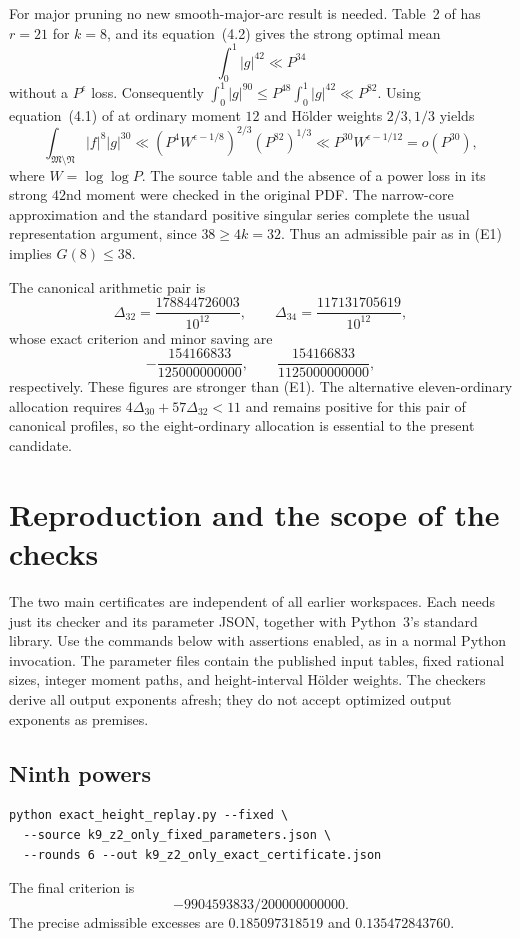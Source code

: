 \documentclass[11pt,letterpaper]{article}
\numberwithin{equation}{section}
\begin{document}
For major pruning no new smooth-major-arc result is needed. Table~2 of
\cite{W16} has $r=21$ for $k=8$, and its equation~(4.2) gives the strong
optimal mean
\[
 \int_0^1|g|^{42}\ll P^{34}
\]
without a $P^\epsilon$ loss. Consequently
$\int_0^1|g|^{90}\le P^{48}\int_0^1|g|^{42}\ll P^{82}$.
Using equation~(4.1) of \cite{W16} at ordinary moment $12$ and H\"older
weights $2/3,1/3$ yields
\[
 \int_{\mathfrak M\setminus\mathfrak N}|f|^8|g|^{30}
 \ll (P^4W^{\epsilon-1/8})^{2/3}(P^{82})^{1/3}
 \ll P^{30}W^{\epsilon-1/12}=o(P^{30}),
\]
where $W=\log\log P$. The source table and the absence of a power loss
in its strong $42$nd moment were checked in the original PDF.
The narrow-core approximation and the standard positive singular series
complete the usual representation argument, since $38\ge4k=32$.
Thus an admissible pair as in (E1) implies $G(8)\le38$.

The canonical arithmetic pair is
\[
 \Delta_{32}=\frac{178844726003}{10^{12}},\qquad
 \Delta_{34}=\frac{117131705619}{10^{12}},
\]
whose exact criterion and minor saving are
\[
 -\frac{154166833}{125000000000},\qquad
 \frac{154166833}{1125000000000},
\]
respectively. These figures are stronger than (E1).
The alternative eleven-ordinary allocation requires
$4\Delta_{30}+57\Delta_{32}<11$ and remains positive for this pair of
canonical profiles, so the eight-ordinary allocation is essential to the
present candidate.

\par\bigskip{}

\section{Reproduction and the scope of the checks}
\label{sec:reproduction}

The two main certificates are independent of all earlier workspaces. Each
needs just its checker and its parameter JSON, together with Python~3's
standard library. Use the commands below with assertions enabled, as in a
normal Python invocation. The parameter files contain the published input
tables, fixed rational sizes, integer moment paths, and height-interval
H\"older weights. The checkers derive all output exponents afresh; they do
not accept optimized output exponents as premises.

\subsection{Ninth powers}
\begin{verbatim}
python exact_height_replay.py --fixed \
  --source k9_z2_only_fixed_parameters.json \
  --rounds 6 --out k9_z2_only_exact_certificate.json
\end{verbatim}
The final criterion is
\[
                   -9904593833/200000000000.
\]
The precise admissible excesses are $0.185097318519$ and $0.135472843760$.
\end{document}
